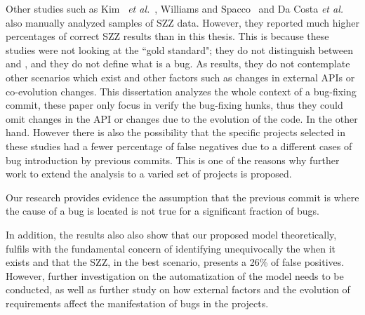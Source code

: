 \documentclass[a4paper, 12pt]{book}
\begin{document}
Other studies such as Kim ~\emph{et al.}~\cite{kim2006automatic},  Williams and Spacco~\cite{williams2008szz} and Da Costa \emph{et al.} also manually analyzed samples of SZZ data. However, they reported much higher percentages of correct SZZ results than in this thesis. This is because these studies were not looking at the ``gold standard"; they do not distinguish between \BIC and \FFC, and they do not define what is a bug. As results, they do not contemplate other scenarios which exist and other factors such as changes in external APIs or co-evolution changes. This dissertation analyzes the whole context of a bug-fixing commit, these paper only focus in verify the bug-fixing hunks, thus they could omit changes in the API or changes due to the evolution of the code. In the other hand. However there is also the possibility that the specific projects selected in these studies had a fewer percentage of false negatives due to a different cases of bug introduction by previous commits. This is one of the reasons why further work to extend the analysis to a varied set of projects is proposed. 

Our research provides evidence the assumption that the previous commit is where the cause of a bug is located is not true for a significant fraction of bugs. 

In addition, the results also also show that our proposed model theoretically, fulfils with the fundamental concern of identifying unequivocally the \BIC when it exists and that the SZZ, in the best scenario, presents a 26\% of false positives. However, further investigation on the automatization of the model needs to be conducted, as well as further study on how external factors and the evolution of requirements affect the manifestation of bugs in the projects.  
\end{document}
